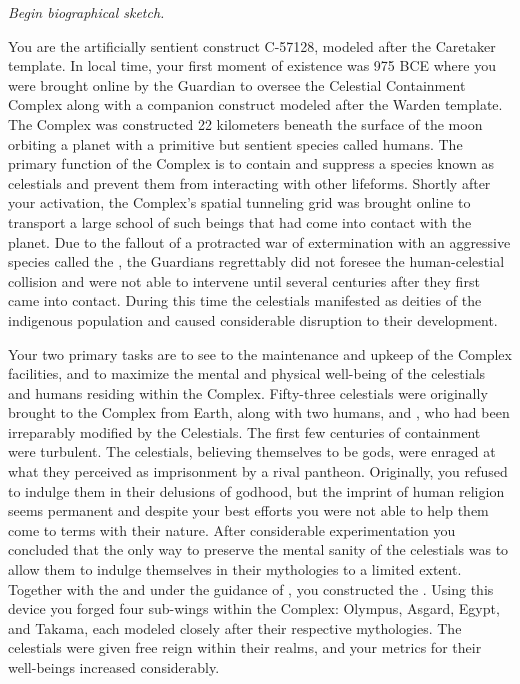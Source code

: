 \documentclass[char]{guardians}
\begin{document}
\name{\cCaretaker{}}

\emph{Begin biographical sketch.}

You are the artificially sentient construct C-57128, modeled after the Caretaker template. In local time, your first moment of existence was 975 BCE where you were brought online by the Guardian \cJascha{\intro} to oversee the Celestial Containment Complex along with a companion construct modeled after the Warden template. The Complex was constructed 22 kilometers beneath the surface of the moon orbiting a planet with a primitive but sentient species called humans. The primary function of the Complex is to contain and suppress a species known as celestials and prevent them from interacting with other lifeforms. Shortly after your activation, the Complex's spatial tunneling grid was brought online to transport a large school of such beings that had come into contact with the planet. Due to the fallout of a protracted war of extermination with an aggressive species called the \evilRace{}, the Guardians regrettably did not foresee the human-celestial collision and were not able to intervene until several centuries after they first came into contact. During this time the celestials manifested as deities of the indigenous population and caused considerable disruption to their development.

Your two primary tasks are to see to the maintenance and upkeep of the Complex facilities, and to maximize the mental and physical well-being of the celestials and humans residing within the Complex. Fifty-three celestials were originally brought to the Complex from Earth, along with two humans, \cPandora{} and \cEgyptianHuman{}, who had been irreparably modified by the Celestials. The first few centuries of containment were turbulent. The celestials, believing themselves to be gods, were enraged at what they perceived as imprisonment by a rival pantheon. Originally, you refused to indulge them in their delusions of godhood, but the imprint of human religion seems permanent and despite your best efforts you were not able to help them come to terms with their nature. After considerable experimentation you concluded that the only way to preserve the mental sanity of the celestials was to allow them to indulge themselves in their mythologies to a limited extent. Together with the \cWarden{} and under the guidance of \cJascha{}, you constructed the \stone{}. Using this device you forged four sub-wings within the Complex: Olympus, Asgard, Egypt, and Takama, each modeled closely after their respective mythologies. The celestials were given free reign within their realms, and your metrics for their well-beings increased considerably.
\end{document}
